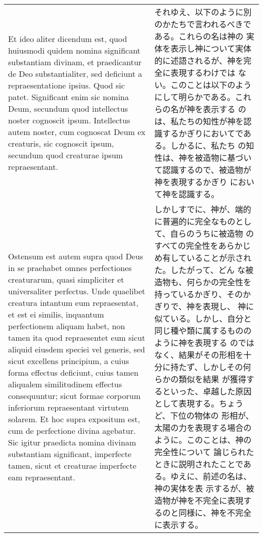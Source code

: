 \documentclass[10pt]{jsarticle}
\begin{document}
\begin{longtable}{p{21em}p{21em}}
\\

Et ideo aliter dicendum est, quod huiusmodi quidem nomina significant
substantiam divinam, et praedicantur de Deo substantialiter, sed
deficiunt a repraesentatione ipsius. Quod sic patet. Significant enim
sic nomina Deum, secundum quod intellectus noster cognoscit
ipsum. Intellectus autem noster, cum cognoscat Deum ex creaturis, sic
cognoscit ipsum, secundum quod creaturae ipsum repraesentant.

&

それゆえ、以下のように別のかたちで言われるべきである。これらの名は神の
実体を表示し神について実体的に述語されるが、神を完全に表現するわけでは
ない。このことは以下のようにして明らかである。これらの名が神を表示する
のは、私たちの知性が神を認識するかぎりにおいてである。しかるに、私たち
の知性は、神を被造物に基づいて認識するので、被造物が神を表現するかぎり
において神を認識する。

\\

Ostensum est autem supra quod Deus in se praehabet omnes perfectiones
creaturarum, quasi simpliciter et universaliter perfectus. Unde
quaelibet creatura intantum eum repraesentat, et est ei similis,
inquantum perfectionem aliquam habet, non tamen ita quod repraesentet
eum sicut aliquid eiusdem speciei vel generis, sed sicut excellens
principium, a cuius forma effectus deficiunt, cuius tamen aliqualem
similitudinem effectus consequuntur; sicut formae corporum inferiorum
repraesentant virtutem solarem. Et hoc supra expositum est, cum de
perfectione divina agebatur. Sic igitur praedicta nomina divinam
substantiam significant, imperfecte tamen, sicut et creaturae
imperfecte eam repraesentant.

&

しかしすでに、神が、端的に普遍的に完全なものとして、自らのうちに被造物
のすべての完全性をあらかじめ有していることが示された。したがって、どん
な被造物も、何らかの完全性を持っているかぎり、そのかぎりで、神を表現し、
神に似ている。しかし、自分と同じ種や類に属するもののように神を表現する
のではなく、結果がその形相を十分に持たず、しかしその何らかの類似を結果
が獲得するといった、卓越した原因として表現する。ちょうど、下位の物体の
形相が、太陽の力を表現する場合のように。このことは、神の完全性について
論じられたときに説明されたことである。ゆえに、前述の名は、神の実体を表
示するが、被造物が神を不完全に表現するのと同様に、神を不完全に表示する。

\\


\end{longtable}
\end{document}
